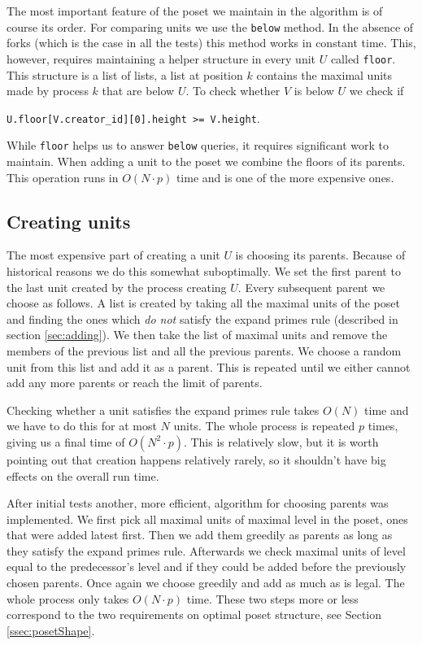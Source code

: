 \documentclass[a4paper,10pt]{article}
\begin{document}
			The most important feature of the poset we maintain in the algorithm is of course its order.
			For comparing units we use the \lstinline{below} method. In the absence of forks (which is the case in all the tests) this method works in constant time.
			This, however, requires maintaining a helper structure in every unit $U$ called \lstinline{floor}.
			This structure is a list of lists, a list at position $k$ contains the maximal units made by process $k$ that are below $U$.
			To check whether $V$ is below $U$ we check if
			\begin{center}
			\lstinline{U.floor[V.creator_id][0].height >= V.height}.
			\end{center}
			While \lstinline{floor} helps us to answer \lstinline{below} queries, it requires significant work to maintain. When adding a unit to the poset we combine the floors of its parents.
			This operation runs in $O(N \cdot p)$ time and is one of the more expensive ones.
		\subsection{Creating units}
		 \label{sec:creation}
			The most expensive part of creating a unit $U$ is choosing its parents. Because of historical reasons we do this somewhat suboptimally.
			We set the first parent to the last unit created by the process creating $U$. Every subsequent parent we choose as follows.
			A list is created by taking all the maximal units of the poset and finding the ones which \emph{do not} satisfy the expand primes rule (described in section \ref{sec:adding}).
			We then take the list of maximal units and remove the members of the previous list and all the previous parents.
			We choose a random unit from this list and add it as a parent. This is repeated until we either cannot add any more parents or reach the limit of parents.

			Checking whether a unit satisfies the expand primes rule takes $O(N)$ time and we have to do this for at most $N$ units.
			The whole process is repeated $p$ times, giving us a final time of $O(N^2 \cdot p)$.
			This is relatively slow, but it is worth pointing out that creation happens relatively rarely, so it shouldn't have big effects on the overall run time.

			After initial tests another, more efficient, algorithm for choosing parents was implemented.
			We first pick all maximal units of maximal level in the poset, ones that were added latest first.
			Then we add them greedily as parents as long as they satisfy the expand primes rule.
			Afterwards we check maximal units of level equal to the predecessor's level and if they could be added before the previously chosen parents.
			Once again we choose greedily and add as much as is legal. The whole process only takes $O(N \cdot p)$ time.
			These two steps more or less correspond to the two requirements on optimal poset structure, see Section \ref{ssec:posetShape}.
\end{document}
